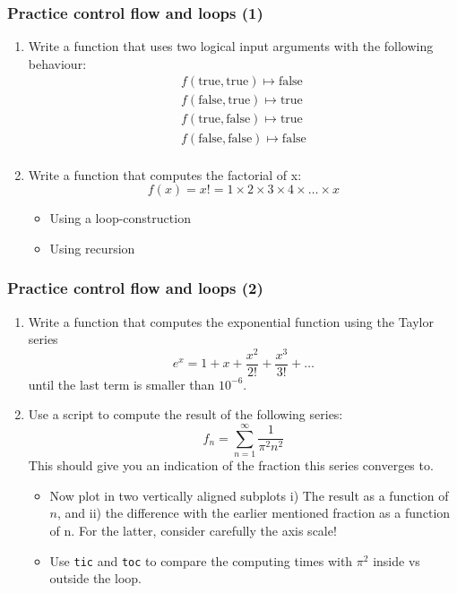  \begin{frame}[fragile]
  \frametitle{Practice control flow and loops (1)}
  \begin{enumerate}
    \item Write a function that uses two logical input arguments with the following behaviour:
    \begin{align*}
       f(\text{true},\text{true}) \mapsto \text{false} \\
      f(\text{false},\text{true}) \mapsto \text{true} \\ 
      f(\text{true},\text{false}) \mapsto \text{true} \\
      f(\text{false},\text{false}) \mapsto \text{false} \\
    \end{align*}
    \item Write a function that computes the factorial of x:
    \[ f(x) = x! = 1 \times 2 \times 3 \times 4 \times \ldots \times x \]
    \begin{itemize}
      \item Using a loop-construction
      \item Using recursion
    \end{itemize}
  \end{enumerate}
 \end{frame}

 \begin{frame}[fragile]
  \frametitle{Practice control flow and loops (2)}
  \begin{enumerate}
    \item Write a function that computes the exponential function using the Taylor series
    \[  e^x = 1 + x + \frac{x^2}{2!} + \frac{x^3}{3!} + \ldots \]
    until the last term is smaller than $10^{-6}$.
    \item Use a script to compute the result of the following series:
    \[
      f_n = \sum_{n=1}^{\infty} \frac{1}{\pi^2 n^2}
    \]
    This should give you an indication of the fraction this series converges to.
    \begin{itemize}
      \item Now plot in two vertically aligned subplots i) The result as a function of $n$, and ii) the difference with the earlier mentioned fraction as a function of n. For the latter, consider carefully the axis scale!
      \item Use \lstinline$tic$ and \lstinline$toc$ to compare the computing times with $\pi^2$ inside vs outside the loop.
    \end{itemize}
  \end{enumerate}
 \end{frame}

